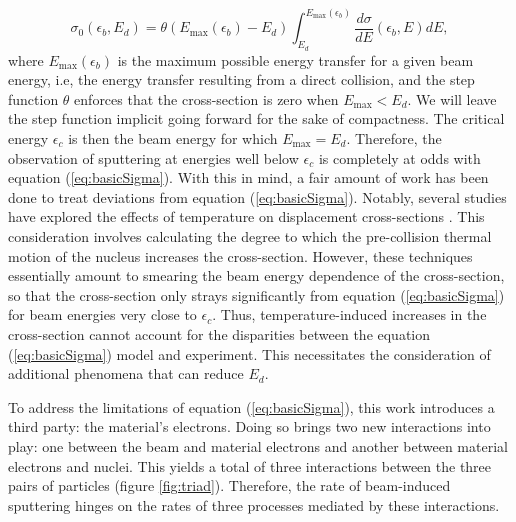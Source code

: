 \documentclass{article}
\begin{document}
\begin{equation}
  \sigma_0(\epsilon_b, {E}_d)
  =
  \theta(E_\text{max}(\epsilon_b) - E_d)
  \int_{E_d}^{E_\text{max}(\epsilon_b)}
  \frac{d\sigma}{dE}(\epsilon_b, E)
  dE,
  \label{eq:basicSigma}
\end{equation}
%
where $E_\text{max}(\epsilon_b)$
is the maximum possible energy transfer for a given beam energy, i.e, the
energy transfer resulting from a direct collision, and the step function
$\theta$ enforces that the cross-section is zero when $E_\text{max} < E_d$.
We will leave the step function implicit going forward for the sake of
compactness.
The critical energy $\epsilon_c$ is then the beam energy for which
$E_\text{max}=E_d$.
Therefore, the observation of sputtering at energies well below $\epsilon_c$ is
completely at odds with equation (\ref{eq:basicSigma}).
With this in mind, a fair amount of work has been done to treat deviations from
equation (\ref{eq:basicSigma}).
Notably, several studies have explored the effects of temperature on
displacement cross-sections 
\cite{Meyer2012,Susi2016,Yoshimura2018}.
This consideration involves calculating the degree to which the pre-collision
thermal motion of the nucleus increases the cross-section.
However, these techniques essentially amount to smearing the beam energy
dependence of the cross-section, so that the cross-section only strays
significantly from equation (\ref{eq:basicSigma}) for beam energies very close
to $\epsilon_c$.
Thus, temperature-induced increases in the cross-section cannot account for the
disparities between the equation (\ref{eq:basicSigma}) model and
experiment.
This necessitates the consideration of additional phenomena that can reduce
$E_d$.

To address the limitations of equation (\ref{eq:basicSigma}), this work
introduces a third party: the material's electrons.
Doing so brings two new interactions into play: one between the beam and
material electrons and another between material electrons and nuclei.
This yields a total of three interactions between the three pairs of particles
(figure \ref{fig:triad}).
Therefore, the rate of beam-induced sputtering hinges on the rates of three
processes mediated by these interactions.
\end{document}
